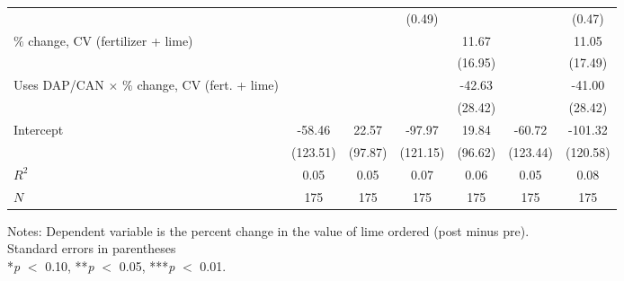 \begin{table}[htbp]
\begin{threeparttable}
\begin{tabular}{l cccccc}
                    &               &               &      (0.49)   &               &               &      (0.47)   \\
$\%$ change, CV (fertilizer + lime)&               &               &               &       11.67   &               &       11.05   \\
                    &               &               &               &     (16.95)   &               &     (17.49)   \\
Uses DAP/CAN $\times$ $\%$ change, CV (fert. + lime)&               &               &               &      -42.63   &               &      -41.00   \\
                    &               &               &               &     (28.42)   &               &     (28.42)   \\
Intercept           &      -58.46   &       22.57   &      -97.97   &       19.84   &      -60.72   &     -101.32   \\
                    &    (123.51)   &     (97.87)   &    (121.15)   &     (96.62)   &    (123.44)   &    (120.58)   \\
\hline
$R^2$               &        0.05   &        0.05   &        0.07   &        0.06   &        0.05   &        0.08   \\
$N$                 &         175   &         175   &         175   &         175   &         175   &         175   \\
\hline
\hline
\end{tabular}
\begin{tablenotes}
\footnotesize
\item{Notes:  Dependent variable is the percent change in the value of lime ordered (post minus pre). \\ Standard errors in parentheses \\ *\textit{p} $<$ 0.10, **\textit{p} $<$ 0.05, ***\textit{p} $<$ 0.01.}
\end{tablenotes}
\end{threeparttable}
\end{table}

